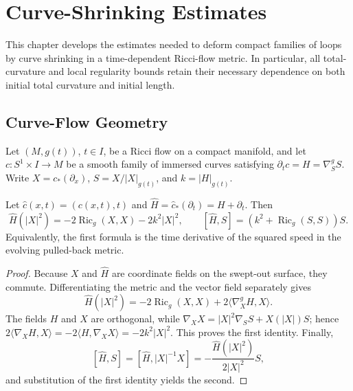 \chapter{Curve-Shrinking Estimates}

This chapter develops the estimates needed to deform compact families of loops
by curve shrinking in a time-dependent Ricci-flow metric.  In particular, all
total-curvature and local regularity bounds retain their necessary dependence
on both initial total curvature and initial length.

\section{Curve-Flow Geometry}

Let $(M,g(t))$, $t\in I$, be a Ricci flow on a compact manifold, and let
$c\colon S^1\times I\to M$ be a smooth family of immersed curves satisfying
$\partial_t c=H=\nabla^g_SS$.  Write $X=c_*(\partial_x)$,
$S=X/|X|_{g(t)}$, and $k=|H|_{g(t)}$.

\begin{theorem}
\label{lem:curve-flow-speed-and-tangent-evolution}
\notready
Let $\widehat c(x,t)=(c(x,t),t)$ and
$\widehat H=\widehat c_*(\partial_t)=H+\partial_t$.  Then
\[
 \widehat H(|X|^2)=-2\operatorname{Ric}_g(X,X)-2k^2|X|^2,
 \qquad
 [\widehat H,S]=(k^2+\operatorname{Ric}_g(S,S))S .
\]
Equivalently, the first formula is the time derivative of the squared speed in
the evolving pulled-back metric.
\end{theorem}
\begin{proof}
Because $X$ and $\widehat H$ are coordinate fields on the swept-out surface,
they commute.  Differentiating the metric and the vector field separately gives
\[
 \widehat H(|X|^2)=-2\operatorname{Ric}_g(X,X)
        +2\langle\nabla_X^gH,X\rangle .
\]
The fields $H$ and $X$ are orthogonal, while
$\nabla_XX=|X|^2\nabla_SS+X(|X|)S$; hence
$2\langle\nabla_XH,X\rangle=-2\langle H,\nabla_XX\rangle
=-2k^2|X|^2$.  This proves the first identity.  Finally,
\[
 [\widehat H,S]=[\widehat H,|X|^{-1}X]
 =-\frac{\widehat H(|X|^2)}{2|X|^2}S,
\]
and substitution of the first identity yields the second.
\end{proof}

